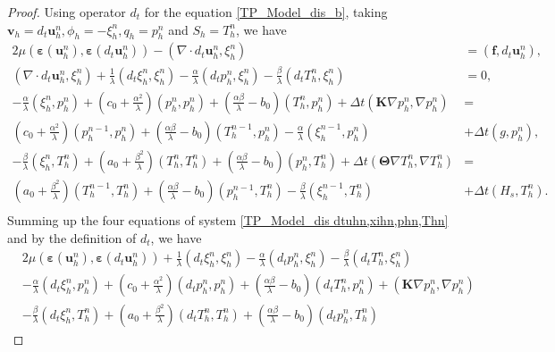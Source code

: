 \documentclass{article}
\numberwithin{equation}{section}
\begin{document}
\begin{proof}
Using operator $d_t$ for the equation \eqref{TP_Model_dis_b}, taking $\bm v_h=d_t\bm u_h^n,\phi_h=-\xi_h^n,q_h=p_h^n$ and $S_h=T_h^n$, we have
\begin{equation}\label{TP_Model_dis dtuhn,xihn,phn,Thn}
\begin{aligned} 
2\mu(\bm\varepsilon(\bm u^n_h),\bm\varepsilon(d_t\bm u_h^n)) - (\nabla\cdot d_t\bm u_h^n,\xi^n_h)&=(\bm f,d_t\bm u_h^n)       ,   \\
   (\nabla\cdot d_t\bm u^n_h,\xi_h^n)+\frac{1}{\lambda}( d_t\xi^n_h,\xi_h^n)-\frac{\alpha}{\lambda}( d_tp^n_h,\xi_h^n)-\frac{\beta}{\lambda}( d_tT^n_h,\xi_h^n)&=0 ,\\
 -  \frac\alpha\lambda(\xi_h^n,p_h^n)+(c_0+\frac{\alpha^2}{\lambda})(p_h^n,p_h^n)
 + (\frac{\alpha\beta}{\lambda}-b_0)(T_h^n,p_h^n) 
                +   \Delta t( \bm K\nabla  p^n_h,\nabla p_h^n)&= \\
          (c_0+\frac{\alpha^2}{\lambda})(p_h^{n-1},p_h^n)
           + (\frac{\alpha\beta}{\lambda}-b_0)(T_h^{n-1},p_h^n)
            -  \frac\alpha\lambda(\xi_h^{n-1},p_h^n)
           &+\Delta t(g,p_h^n),\\
  -\frac\beta\lambda(\xi_h^n,T_h^n)+(a_0+\frac{\beta^2}{\lambda})(T_h^n,T_h^n)
  +(\frac{\alpha\beta}{\lambda}-b_0)(p_h^n,T_h^n)  
            +\Delta t(\bm\Theta\nabla T^n_h,\nabla T_h^n) &    =         \\
        (a_0+\frac{\beta^2}{\lambda})(T_h^{n-1},T_h^n) 
           +(\frac{\alpha\beta}{\lambda}-b_0)(p_h^{n-1},T_h^n)    
               -\frac\beta\lambda(\xi_h^{n-1},T_h^n)
           & +\Delta t( H_{s},T_h^n).\\
\end{aligned}
\end{equation}
Summing up the four equations of system \eqref{TP_Model_dis dtuhn,xihn,phn,Thn} and by the definition of $d_t$,
we have
\begin{equation}    
\begin{aligned} 
&2\mu(\bm\varepsilon(\bm u_h^n),\bm\varepsilon(d_t\bm u_h^n))+\frac{1}{\lambda}(d_t\xi_h^n,\xi_h^n)-\frac{\alpha}{\lambda}(d_tp_h^n,\xi_h^n)-\frac{\beta}{\lambda}(d_tT_h^n,\xi_h^n)\\
& -\frac\alpha\lambda(d_t\xi_h^n ,p_h^n)+(c_0+\frac{\alpha^2}{\lambda})(d_tp_h^n ,p_h^n)+(\frac{\alpha\beta}{\lambda}-b_0)(d_tT_h^n ,p_h^n)+(\bm K \nabla p_h^n,\nabla p_h^n) \\
& -\frac\beta\lambda(d_t\xi_h^n ,T_h^n)+(a_0+\frac{\beta^2}{\lambda})(d_tT_h^n ,T_h^n) +(\frac{\alpha\beta}{\lambda}-b_0)(d_tp_h^n ,T_h^n)  

\end{aligned}
\end{equation}
\end{proof}
\end{document}
